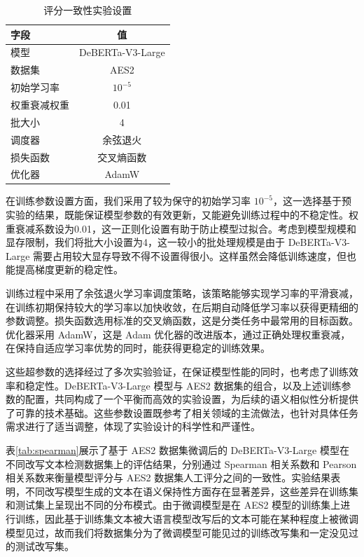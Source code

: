 \begin{table}[htbp]
\centering
\caption{评分一致性实验设置} \label{tab:score-set}
\begin{tabular}{lc}
\toprule
\textbf{字段}   & \textbf{值}   \\ \midrule
模型            & DeBERTa-V3-Large \\
数据集          & AES2             \\
初始学习率       & $10^{-5}$        \\
权重衰减权重     & 0.01             \\
批大小          & 4                \\
调度器          & 余弦退火           \\
损失函数        & 交叉熵函数         \\
优化器          & AdamW            \\ \bottomrule
\end{tabular}
\end{table}

在训练参数设置方面，我们采用了较为保守的初始学习率 $10^{-5}$，这一选择基于预实验的结果，既能保证模型参数的有效更新，又能避免训练过程中的不稳定性。权重衰减系数设为0.01，这一正则化设置有助于防止模型过拟合。考虑到模型规模和显存限制，我们将批大小设置为4，这一较小的批处理规模是由于 DeBERTa-V3-Large 需要占用较大显存导致不得不设置得很小。这样虽然会降低训练速度，但也能提高梯度更新的稳定性。

训练过程中采用了余弦退火学习率调度策略，该策略能够实现学习率的平滑衰减，在训练初期保持较大的学习率以加快收敛，在后期自动降低学习率以获得更精细的参数调整。损失函数选用标准的交叉熵函数，这是分类任务中最常用的目标函数。优化器采用 AdamW，这是 Adam 优化器的改进版本，通过正确处理权重衰减，在保持自适应学习率优势的同时，能获得更稳定的训练效果。

这些超参数的选择经过了多次实验验证，在保证模型性能的同时，也考虑了训练效率和稳定性。DeBERTa-V3-Large 模型与 AES2 数据集的组合，以及上述训练参数的配置，共同构成了一个平衡而高效的实验设置，为后续的语义相似性分析提供了可靠的技术基础。这些参数设置既参考了相关领域的主流做法，也针对具体任务需求进行了适当调整，体现了实验设计的科学性和严谨性。

表\ref{tab:spearman}展示了基于 AES2 数据集微调后的 DeBERTa-V3-Large 模型在不同改写文本检测数据集上的评估结果，分别通过 Spearman 相关系数和 Pearson 相关系数来衡量模型评分与 AES2 数据集人工评分之间的一致性。实验结果表明，不同改写模型生成的文本在语义保持性方面存在显著差异，这些差异在训练集和测试集上呈现出不同的分布模式。由于微调模型是在 AES2 模型的训练集上进行训练，因此基于训练集文本被大语言模型改写后的文本可能在某种程度上被微调模型见过，故而我们将数据集分为了微调模型可能见过的训练改写集和一定没见过的测试改写集。

